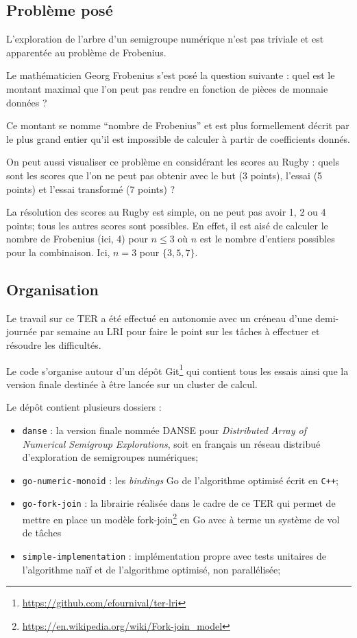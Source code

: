 \documentclass[12pt,a4paper]{article}
\let\leq\leqslant
\begin{document}
\subsection*{Problème posé}
L'exploration de l'arbre d'un semigroupe numérique n'est pas triviale et est apparentée au problème de Frobenius.

Le mathématicien Georg Frobenius s'est posé la question suivante : quel est le montant maximal que l'on peut pas rendre en fonction de pièces de monnaie données ?

Ce montant se nomme ``nombre de Frobenius'' et est plus formellement décrit par le plus grand entier qu'il est impossible de calculer à partir de coefficients donnés.

On peut aussi visualiser ce problème en considérant les scores au Rugby : quels sont les scores que l'on ne peut pas obtenir avec le but (3 points), l'essai (5 points) et l'essai transformé (7 points) ?

La résolution des scores au Rugby est simple, on ne peut pas avoir 1, 2 ou 4 points; tous les autres scores sont possibles. En effet, il est aisé de calculer le nombre de Frobenius (ici, 4) pour $n \leq 3$ où $n$ est le nombre d'entiers possibles pour la combinaison. Ici, $n = 3$ pour $\{3,5,7\}$.

\subsection*{Organisation}
Le travail sur ce TER a été effectué en autonomie avec un créneau d'une demi-journée par semaine au LRI pour faire le point sur les tâches à effectuer et résoudre les difficultés.

Le code s'organise autour d'un dépôt Git\footnote{\url{https://github.com/efournival/ter-lri}} qui contient tous les essais ainsi que la version finale destinée à être lancée sur un cluster de calcul.

Le dépôt contient plusieurs dossiers :
\begin{itemize}
	\item	\texttt{danse} : la version finale nommée DANSE pour \emph{Distributed Array of Numerical Semigroup Explorations}, soit en français un réseau distribué d'exploration de semigroupes numériques;
	\item	\texttt{go-numeric-monoid} : les \emph{bindings} Go de l'algorithme optimisé écrit en \texttt{C++};
	\item	\texttt{go-fork-join} : la librairie réalisée dans le cadre de ce TER qui permet de mettre en place un modèle fork-join\footnote{\url{https://en.wikipedia.org/wiki/Fork-join_model}} en Go avec à terme un système de vol de tâches
	\item	\texttt{simple-implementation} : implémentation propre avec tests unitaires de l'algorithme naïf et de l'algorithme optimisé, non parallélisée;
\end{itemize}
\end{document}
